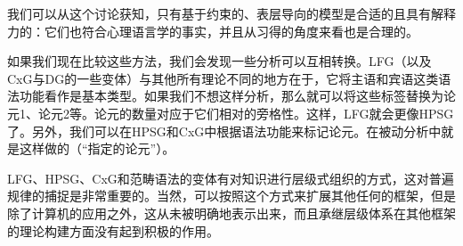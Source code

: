 我们可以从这个讨论获知，只有基于约束的、表层导向的模型是合适的且具有解释力的：它们也符合心理语言学的事实，并且从习得的角度来看也是合理的。

如果我们现在比较这些方法，我们会发现一些分析可以互相转换。LFG（以及CxG与DG的一些变体）与其他所有理论不同的地方在于，它将主语和宾语这类语法功能看作是基本类型。如果我们不想这样分析，那么就可以将这些标签替换为论元1、论元2等。论元的数量对应于它们相对的旁格性。这样，LFG就会更像HPSG了。另外，我们可以在HPSG和CxG中根据语法功能来标记论元。在被动分析中就是这样做的（“指定的论元”）。

LFG、HPSG、CxG和范畴语法的变体\citep{MCKRZ89a-u,Briscoe2000a,Villavicencio2002a}有对知识进行层级式组织的方式，这对普遍规律的捕捉是非常重要的。当然，可以按照这个方式来扩展其他任何的框架，但是除了计算机的应用之外，这从未被明确地表示出来，而且承继层级体系在其他框架的理论构建方面没有起到积极的作用。

